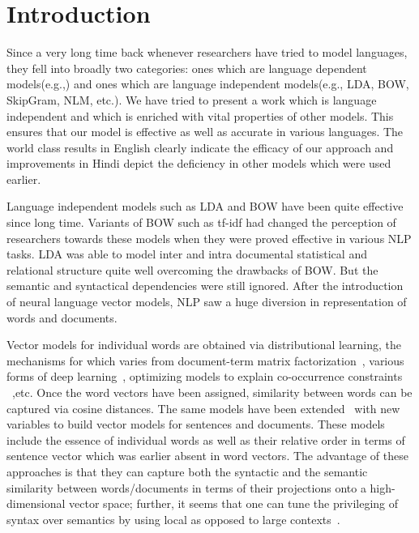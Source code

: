 \chapter{Introduction}
Since a very long time back whenever researchers have tried to model languages, they fell into broadly two categories: ones which are language dependent models(e.g.,\cite{Socher:13}) and ones which are language independent models(e.g., LDA, BOW, SkipGram, NLM, etc.). We have tried to present a work which is language independent and which is enriched with vital properties of other models. This ensures that our model is effective as well as accurate in various languages. The world class results in English clearly indicate the efficacy of our approach and improvements in Hindi depict the deficiency in other models which were used earlier.

Language independent models such as LDA  and BOW have been quite effective since long time. Variants of BOW such as tf-idf had changed the perception of researchers towards these models when they were proved effective in various NLP tasks. LDA was able to model inter and intra documental statistical and relational structure quite well overcoming the drawbacks of BOW. But the semantic and syntactical dependencies were still ignored. After the introduction of neural language vector models,  NLP saw a huge diversion in representation of words and documents.

Vector models for individual words are obtained via distributional learning, the mechanisms for which varies from document-term matrix factorization~\cite{Landauer:97}, various forms of deep learning~\cite{Collobert:08,Turian:10,Socher:13}, optimizing models to explain co-occurrence constraints ~\cite{Mikolov:13a,Pennington:14},etc. Once the word vectors have been assigned, similarity between words can be captured via cosine distances. The same models have been extended~\cite{Le:14} with new variables to build vector models for sentences and documents. These models include the essence of individual words as well as their relative order in terms of sentence vector which was earlier absent in word vectors. The advantage of these approaches is that they can capture both the syntactic and the semantic similarity between words/documents in terms of their projections onto a high-dimensional vector space; further, it seems that one can tune the privileging of syntax over semantics by using local as opposed to large contexts~\cite{Huang:12}.

